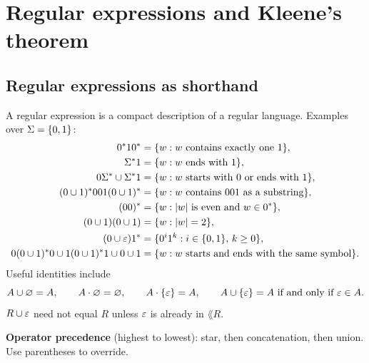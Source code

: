 \section{Regular expressions and Kleene's theorem}

\subsection{Regular expressions as shorthand}
A regular expression is a compact description of a regular
language. Examples over $\Sigma=\{0,1\}$:
\[
\begin{aligned}
  0^*10^*
    &=\{w:w\text{ contains exactly one }1\},\\
  \Sigma^*1
    &=\{w:w\text{ ends with }1\},\\
  0\Sigma^*\cup\Sigma^*1
    &=\{w:w\text{ starts with }0\text{ or ends with }1\},\\
  (0\cup 1)^*001(0\cup 1)^*
    &=\{w:w\text{ contains }001\text{ as a substring}\},\\
  (00)^*
    &=\{w:|w|\text{ is even and }w\in 0^*\},\\
  (0\cup 1)(0\cup 1)
    &=\{w:|w|=2\},\\
  (0\cup\varepsilon)1^*
    &=\{0^i1^k:i\in\{0,1\},\,k\geq 0\},\\
  0(0\cup 1)^*0\cup 1(0\cup 1)^*1\cup 0\cup 1
    &=\{w:w\text{ starts and ends with the same symbol}\}.
\end{aligned}
\]
Useful identities include
\[
  A\cup\varnothing=A,\qquad
  A\mathbin{\cdot}\varnothing=\varnothing,\qquad
  A\mathbin{\cdot}\{\varepsilon\}=A,\qquad
  A\cup\{\varepsilon\}=A\text{ if and only if }\varepsilon\in A.
\]
$R\cup\varepsilon$ need not equal $R$ unless $\varepsilon$ is already in $\lang{R}$.

\textbf{Operator precedence} (highest to lowest): star, then concatenation, then
union. Use parentheses to override.

